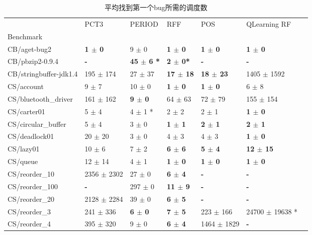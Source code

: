\begin{table}
\begin{spacing}{1.5}
\caption{\label{tab:sample}平均找到第一个bug所需的调度数}
\begin{tabular}{lllllll}
\toprule
 & PCT3 & PERIOD & RFF & POS & QLearning RF \\
Benchmark &  &  &  &  &  &  \\
\midrule
CB/aget-bug2 & \textbf{ 1  $\pm$ 0  } & 9  $\pm$ 0  & \textbf{ 1  $\pm$ 0  } & \textbf{ 1  $\pm$ 0  } & \textbf{ 1  $\pm$ 0  } \\
CB/pbzip2-0.9.4 & \textbf{ - } & \textbf{ 45  $\pm$ 6 * } & \textbf{ 2  $\pm$ 0* } & \textbf{ - } & \textbf{ - } \\
CB/stringbuffer-jdk1.4 & 195  $\pm$ 174  & 27  $\pm$ 37  & \textbf{ 17  $\pm$ 18  } & \textbf{ 18  $\pm$ 23  } & 1405  $\pm$ 1592 \\
CS/account & 9  $\pm$ 7  & 10  $\pm$ 0  & \textbf{ 1  $\pm$ 0  } & \textbf{ 1  $\pm$ 0  } & 6  $\pm$ 8  \\
CS/bluetooth\_driver & 161  $\pm$ 162  & \textbf{ 9  $\pm$ 0  } & 64  $\pm$ 63  & 72  $\pm$ 79  & 155  $\pm$ 154 \\
CS/carter01 & 5  $\pm$ 4  & 4  $\pm$ 1 * & 2  $\pm$ 2  & 2  $\pm$ 1  & \textbf{ 1  $\pm$ 0  } \\
CS/circular\_buffer & 5  $\pm$ 4  & 3  $\pm$ 0  & \textbf{ 1  $\pm$ 1  } & \textbf{ 2  $\pm$ 1  } & \textbf{ 2  $\pm$ 1  } \\
CS/deadlock01 & 20  $\pm$ 20  & 3  $\pm$ 0  & 4  $\pm$ 3  & 4  $\pm$ 3  & \textbf{ 1  $\pm$ 0  } \\
CS/lazy01 & 10  $\pm$ 6  & 7  $\pm$ 2  & \textbf{ 6  $\pm$ 6  } & \textbf{ 5  $\pm$ 4  } & \textbf{ 12  $\pm$ 15  } \\
CS/queue & 12  $\pm$ 14  & 4  $\pm$ 1  & \textbf{ 1  $\pm$ 0  } & \textbf{ 1  $\pm$ 0  } & \textbf{ 1  $\pm$ 0  } \\
CS/reorder\_10 & 2356  $\pm$ 2302  & 27  $\pm$ 0  & \textbf{ 6  $\pm$ 4  } & \textbf{ - } & \textbf{ - }  \\
CS/reorder\_100 & \textbf{ - } & 297  $\pm$ 0  & \textbf{ 11  $\pm$ 9  } & \textbf{ - } & \textbf{ - } \\
CS/reorder\_20 & 2128  $\pm$ 2284  & 39  $\pm$ 0  & \textbf{ 6  $\pm$ 5  } & \textbf{ - } & \textbf{ - } \\
CS/reorder\_3 & 241  $\pm$ 336  & \textbf{ 6  $\pm$ 0  } & \textbf{ 7  $\pm$ 5  } & 223  $\pm$ 166  & 24700  $\pm$ 19638 *  \\
CS/reorder\_4 & 395  $\pm$ 320  & 9  $\pm$ 0  & \textbf{ 6  $\pm$ 4  } & 1464  $\pm$ 1829  & \textbf{ - }  \\

\end{tabular}
\end{spacing}
\end{table}
